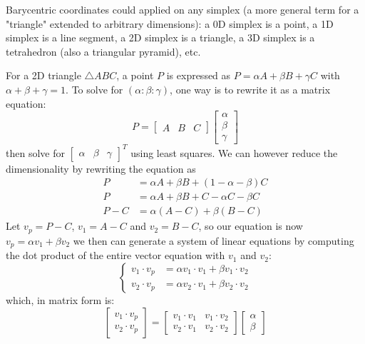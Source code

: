 \documentclass[12pt]{report}
\begin{document}
Barycentric coordinates could applied on any simplex (a more general term for a "triangle" extended to arbitrary dimensions): a 0D simplex is a point, a 1D simplex is a line segment, a 2D simplex is a triangle, a 3D simplex is a tetrahedron (also a triangular pyramid), etc.
		
For a 2D triangle $\triangle ABC$, a point $P$ is expressed as $P = \alpha A + \beta B + \gamma C$ with $\alpha + \beta + \gamma = 1$. To solve for $(\alpha : \beta : \gamma)$, one way is to rewrite it as a matrix equation:
$$
P = 
\begin{bmatrix}
	A & B & C 
\end{bmatrix}
\begin{bmatrix}
	\alpha \\ \beta \\ \gamma
\end{bmatrix}
$$
then solve for $\begin{bmatrix}\alpha & \beta & \gamma\end{bmatrix}^T$ using least squares. We can however reduce the dimensionality by rewriting the equation as
\begin{align*}
	P     & = \alpha A + \beta B + (1 - \alpha - \beta) C \\
	P     & = \alpha A + \beta B + C - \alpha C - \beta C \\
	P - C & = \alpha (A - C) + \beta (B - C)              
\end{align*}
Let $v_p = P - C$, $v_1 = A - C$ and $v_2 = B - C$, so our equation is now $v_p = \alpha v_1 + \beta v_2$ we then can generate a system of linear equations by computing the dot product of the entire vector equation with $v_1$ and $v_2$:
$$
\begin{cases}
	v_1 \cdot v_p & = \alpha v_1 \cdot v_1 + \beta v_1 \cdot v_2 \\
	v_2 \cdot v_p & = \alpha v_2 \cdot v_1 + \beta v_2 \cdot v_2 
\end{cases}
$$
which, in matrix form is:
$$
\begin{bmatrix}
	v_1 \cdot v_p \\
	v_2 \cdot v_p 
\end{bmatrix}
= 
\begin{bmatrix}
	v_1 \cdot v_1 & v_1 \cdot v_2 \\
	v_2 \cdot v_1 & v_2 \cdot v_2 
\end{bmatrix}
\begin{bmatrix}
	\alpha \\ \beta
\end{bmatrix}
$$
\end{document}

